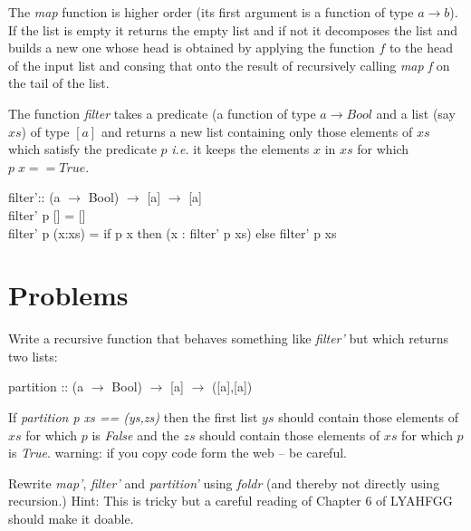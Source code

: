 \documentclass[11pt]{article}
\begin{document}
The {\it{map}} function is higher order (its first argument is a function of
type $a \rightarrow{}b$).  If the list is empty it returns the empty list and
if not it decomposes the list and builds a new one whose head is obtained by
applying the function $f$ to the head of the input list and consing that onto
the result of recursively calling {\it{map f}} on the tail of the list.

The function {\it{filter}} takes a predicate (a function of type
$a\rightarrow{}Bool$ and a list (say $xs$) of type $[a]$ and returns a new list
containing only those elements of $xs$ which satisfy the predicate $p$
{\em{i.e.}} it keeps the elements $x$ in $xs$ for which $p\;x == True$.

\begin{program**}
\> filter':: (a $\rightarrow$ Bool) $\rightarrow$ [a] $\rightarrow$ [a]\\
\> filter' p [] = [] \\
\> filter' p (x:xs) = if p x then (x : filter' p xs) else filter' p xs
\end{program**}

\section{Problems}

\begin{problem}
Write a recursive function that behaves something like {\it{filter'}} but which
returns two lists:
\begin{program**}
\> partition :: (a $\rightarrow$ Bool) $\rightarrow$ [a] $\rightarrow$ ([a],[a])\\
\end{program**}
If {\it{partition p xs == (ys,zs)}} then the first list $ys$ should contain
those elements of $xs$ for which $p$ is {\it{False}} and the $zs$ should
contain those elements of $xs$ for which $p$ is {\it{True}}. warning: if you
copy code form the web -- be careful.
\end{problem}

\begin{problem}
Rewrite {\it{map'}}, {\it{filter'}} and {\it{partition'}} using {\it{foldr}}
(and thereby not directly using recursion.)  Hint: This is tricky but a careful
reading of Chapter 6 of LYAHFGG should make it doable.
\end{problem}
\end{document}
